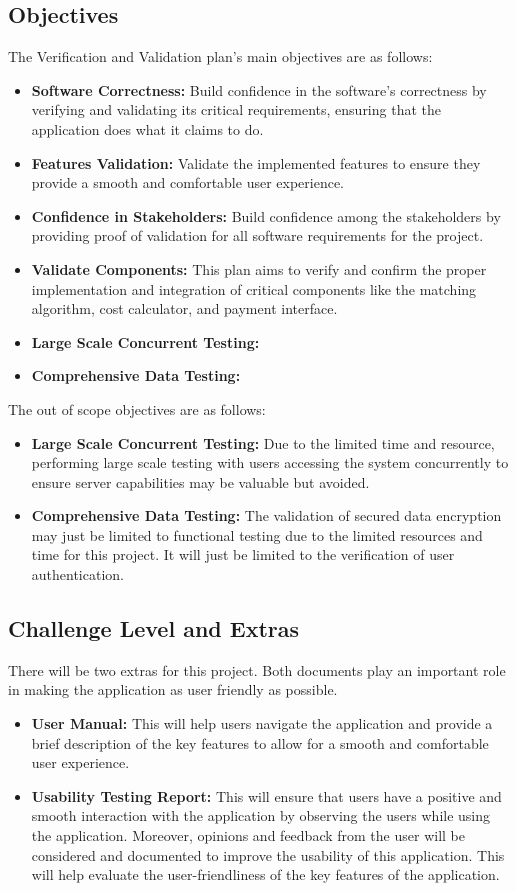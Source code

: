 \documentclass[12pt, titlepage]{article}
\begin{document}
\subsection{Objectives}
The Verification and Validation plan's main objectives are as follows: 
\begin{itemize}
    \item \textbf{Software Correctness:} Build confidence in the software's correctness by verifying and validating its critical requirements, ensuring that the application does what it claims to do. 
    \item \textbf{Features Validation:} Validate the implemented features to ensure they provide a smooth and comfortable user experience. 
    \item \textbf{Confidence in Stakeholders:} Build confidence among the stakeholders by providing proof of validation for all software requirements for the project.  
    \item \textbf{Validate Components:} This plan aims to verify and confirm the proper implementation and integration of critical components like the matching algorithm, cost calculator, and payment interface. 
    \item \textbf{Large Scale Concurrent Testing:}
    \item \textbf{Comprehensive Data Testing:}
\end{itemize}
The out of scope objectives are as follows:
\begin{itemize}
    \item \textbf{Large Scale Concurrent Testing:} Due to the limited time and resource, performing large scale testing with users accessing the system concurrently to ensure server capabilities may be valuable but avoided.  
    \item \textbf{Comprehensive Data Testing:} The validation of secured data encryption may just be limited to functional testing due to the limited resources and time for this project. It will just be limited to the verification of user authentication. 
\end{itemize}

\subsection{Challenge Level and Extras}

There will be two extras for this project. Both documents play an important role in making the application as user friendly as possible. 
\begin{itemize}
    \item \textbf{User Manual:} This will help users navigate the application and provide a brief description of the key features to allow for a smooth and comfortable user experience.
    \item \textbf{Usability Testing Report:} This will ensure that users have a positive and smooth interaction with the application by observing the users while using the application. Moreover, opinions and feedback from the user will be considered and documented to improve the usability of this application. This will help evaluate the user-friendliness of the key features of the application. 
\end{itemize}
\end{document}
